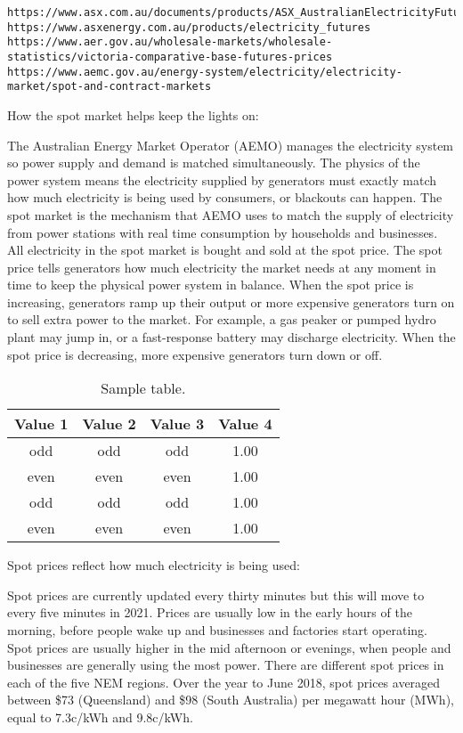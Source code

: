 \begin{flushleft}
\begin{verbatim}
https://www.asx.com.au/documents/products/ASX_AustralianElectricityFuturesandOptions_ContractSpecifications_July2015.pdf
https://www.asxenergy.com.au/products/electricity_futures
https://www.aer.gov.au/wholesale-markets/wholesale-statistics/victoria-comparative-base-futures-prices
https://www.aemc.gov.au/energy-system/electricity/electricity-market/spot-and-contract-markets
\end{verbatim}
How the spot market helps keep the lights on:\par
The Australian Energy Market Operator (AEMO) manages the electricity system so power supply and demand is matched simultaneously. The physics of the power system means the electricity supplied by generators must exactly match how much electricity is being used by consumers, or blackouts can happen. The spot market is the mechanism that AEMO uses to match the supply of electricity from power stations with real time consumption by households and businesses. All electricity in the spot market is bought and sold at the spot price. The spot price tells generators how much electricity the market needs at any moment in time to keep the physical power system in balance. When the spot price is increasing, generators  ramp up their output or more expensive generators turn on to sell extra power to the market. For example, a gas peaker or pumped hydro plant may jump in, or a fast-response battery may discharge electricity. When the spot price is decreasing, more expensive generators turn down or off.\par
\begin{table}[!h]
\centering
\caption{Sample table.}
\begin{tabular}{cccc}
\toprule
Value 1 & Value 2 & Value 3 & Value 4\\
\midrule
 odd     & odd   & odd & 1.00 \\
 even    & even  & even& 1.00 \\
 odd     & odd   & odd & 1.00 \\
 even    & even  & even& 1.00 \\
\bottomrule
\end{tabular}
\end{table}
Spot prices reflect how much electricity is being used:\par
Spot prices are currently updated every thirty minutes but this will move to every five minutes in 2021. Prices are usually low in the early hours of the morning, before people wake up and businesses and factories start operating. Spot prices are usually higher in the mid afternoon or evenings, when people and businesses are generally using the most power. There are different spot prices in each of the five NEM regions. Over the year to June 2018, spot prices averaged between \$73 (Queensland) and \$98 (South Australia) per megawatt hour (MWh), equal to 7.3c/kWh and 9.8c/kWh.
\end{flushleft}